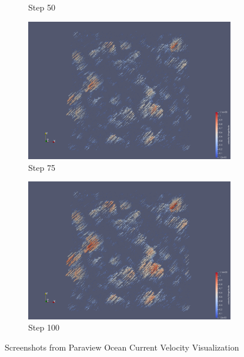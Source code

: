 \documentclass[a4paper,12pt]{article}
\begin{document}
\begin{figure}
\begin{subfigure}{0.4\textwidth}
    \caption{Step 50}
\end{subfigure}
\hfill
\begin{subfigure}{0.4\textwidth}
    \includegraphics[width=\textwidth]{../images/vtk/bonus/velocity/step_75.png}
    \caption{Step 75}
\end{subfigure}

\begin{subfigure}{0.4\textwidth}
    \includegraphics[width=\textwidth]{../images/vtk/bonus/velocity/step_100.png}
    \caption{Step 100}
\end{subfigure}
        
\caption{Screenshots from Paraview Ocean Current Velocity Visualization}
\end{figure}



\end{document}
